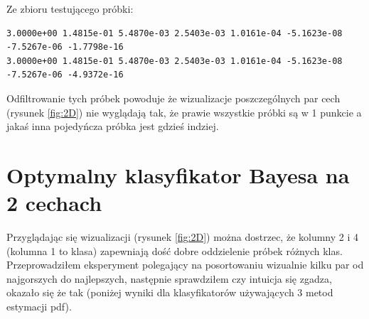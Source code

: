 \documentclass[a4paper]{article}
\begin{document}
Ze zbioru testującego próbki:
\begin{verbatim}
3.0000e+00 1.4815e-01 5.4870e-03 2.5403e-03 1.0161e-04 -5.1623e-08 -7.5267e-06 -1.7798e-16
3.0000e+00 1.4815e-01 5.4870e-03 2.5403e-03 1.0161e-04 -5.1623e-08 -7.5267e-06 -4.9372e-16
\end{verbatim}

Odfiltrowanie tych próbek powoduje że wizualizacje poszczególnych par cech (rysunek \ref{fig:2D})
nie wyglądają tak, że prawie wszystkie próbki są w 1 punkcie a jakaś inna pojedyńcza próbka jest gdzieś indziej.




\section{Optymalny klasyfikator Bayesa na 2 cechach}
Przyglądając się wizualizacji (rysunek \ref{fig:2D}) można dostrzec,
że kolumny 2 i 4 (kolumna 1 to klasa) zapewniają dość dobre oddzielenie próbek różnych klas.
Przeprowadziłem eksperyment polegający na posortowaniu wizualnie kilku par od najgorszych do najlepszych,
następnie sprawdziłem czy intuicja się zgadza, okazało się że tak
(poniżej wyniki dla klasyfikatorów używających 3 metod estymacji pdf).
\end{document}
